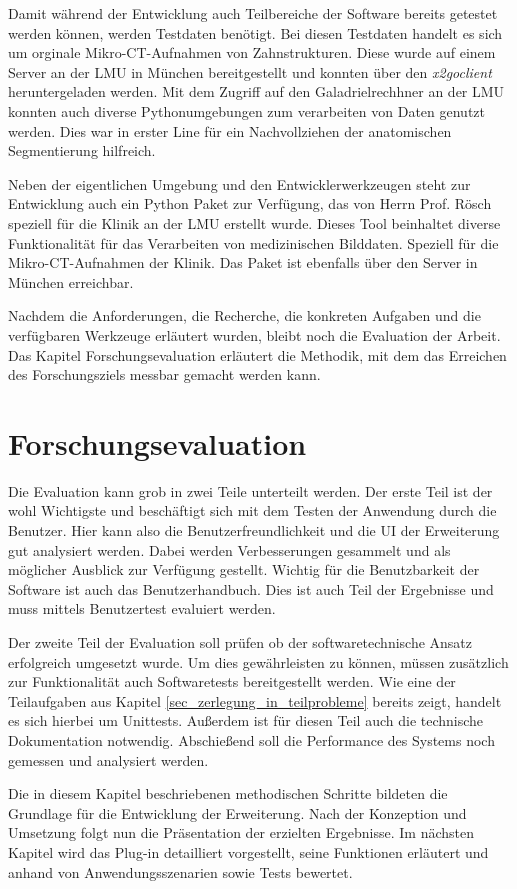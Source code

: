 Damit während der Entwicklung auch Teilbereiche der Software bereits getestet
werden können, werden Testdaten benötigt. Bei diesen Testdaten handelt es sich
um orginale Mikro-\ac{CT}-Aufnahmen von Zahnstrukturen. Diese wurde auf einem
Server an der \ac{LMU} in München bereitgestellt und konnten über den \textit{x2goclient}
heruntergeladen werden. Mit dem Zugriff auf den Galadrielrechhner an der \ac{LMU}
konnten auch diverse Pythonumgebungen zum verarbeiten von Daten genutzt werden. Dies
war in erster Line für ein Nachvollziehen der anatomischen Segmentierung hilfreich.

Neben der eigentlichen Umgebung und den Entwicklerwerkzeugen steht zur Entwicklung
auch ein Python Paket zur Verfügung, das von Herrn Prof. Rösch speziell für die Klinik
an der \ac{LMU} erstellt wurde. Dieses Tool beinhaltet diverse Funktionalität für
das Verarbeiten von medizinischen Bilddaten. Speziell für die Mikro-\ac{CT}-Aufnahmen
der Klinik. Das Paket ist ebenfalls über den Server in München erreichbar.

Nachdem die Anforderungen, die Recherche, die konkreten Aufgaben und die
verfügbaren Werkzeuge erläutert wurden, bleibt noch die Evaluation der Arbeit.
Das Kapitel Forschungsevaluation erläutert die Methodik, mit dem das Erreichen des
Forschungsziels messbar gemacht werden kann.


\section{Forschungsevaluation}
Die Evaluation kann grob in zwei Teile unterteilt werden. Der erste Teil ist der
wohl Wichtigste und beschäftigt sich mit dem Testen der Anwendung durch die Benutzer.
Hier kann also die Benutzerfreundlichkeit und die \ac{UI} der Erweiterung gut analysiert
werden. Dabei werden Verbesserungen gesammelt und als möglicher Ausblick zur
Verfügung gestellt. Wichtig für die Benutzbarkeit der Software ist auch das Benutzerhandbuch.
Dies ist auch Teil der Ergebnisse und muss mittels Benutzertest evaluiert werden.

Der zweite Teil der Evaluation soll prüfen ob der softwaretechnische Ansatz
erfolgreich umgesetzt wurde. Um dies gewährleisten zu können, müssen zusätzlich
zur Funktionalität auch Softwaretests bereitgestellt werden. Wie eine der Teilaufgaben
aus Kapitel \ref{sec_zerlegung_in_teilprobleme} bereits zeigt, handelt es sich
hierbei um Unittests. Außerdem ist für diesen Teil auch die technische Dokumentation
notwendig. Abschießend soll die Performance des Systems noch gemessen und
analysiert werden.

Die in diesem Kapitel beschriebenen methodischen Schritte bildeten die Grundlage
für die Entwicklung der Erweiterung. Nach der Konzeption und Umsetzung folgt nun
die Präsentation der erzielten Ergebnisse. Im nächsten Kapitel wird das Plug-in
detailliert vorgestellt, seine Funktionen erläutert und anhand von Anwendungsszenarien
sowie Tests bewertet.
